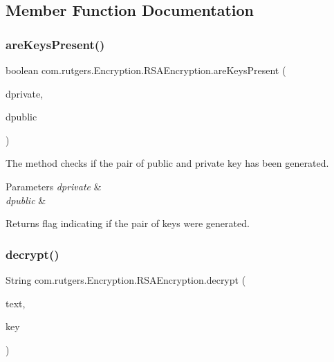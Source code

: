 \subsection{Member Function Documentation}
\mbox{\label{classcom_1_1rutgers_1_1Encryption_1_1RSAEncryption_ae21caf1725128ffba0c83a26e88eea29}} 
\subsubsection{\texorpdfstring{are\+Keys\+Present()}{areKeysPresent()}}
{\footnotesize\ttfamily boolean com.\+rutgers.\+Encryption.\+R\+S\+A\+Encryption.\+are\+Keys\+Present (\begin{DoxyParamCaption}\item[{String}]{dprivate,  }\item[{String}]{dpublic }\end{DoxyParamCaption})}

The method checks if the pair of public and private key has been generated.


\begin{DoxyParams}{Parameters}
{\em dprivate} & \\
\hline
{\em dpublic} & \\
\hline
\end{DoxyParams}
\begin{DoxyReturn}{Returns}
flag indicating if the pair of keys were generated. 
\end{DoxyReturn}
\mbox{\label{classcom_1_1rutgers_1_1Encryption_1_1RSAEncryption_ab590564086c4a7fb7b528ec5a8736407}} 
\subsubsection{\texorpdfstring{decrypt()}{decrypt()}}
{\footnotesize\ttfamily String com.\+rutgers.\+Encryption.\+R\+S\+A\+Encryption.\+decrypt (\begin{DoxyParamCaption}\item[{String}]{text,  }\item[{Private\+Key}]{key }\end{DoxyParamCaption})}

